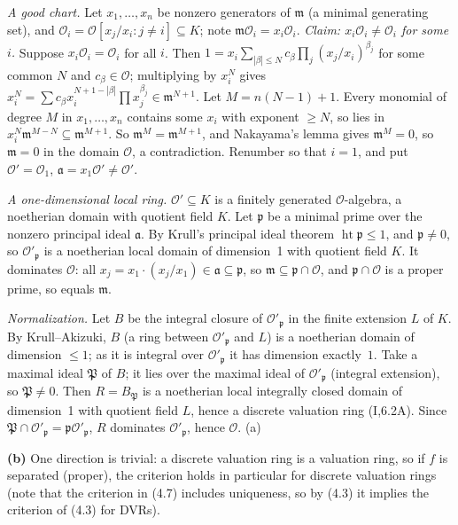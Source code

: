 \documentclass[11pt]{article}
\begin{document}
\emph{A good chart.} Let $x_1,\dots,x_n$ be nonzero generators of $\mathfrak m$ (a minimal generating set), and $\mathcal O_i=\mathcal O[x_j/x_i:j\neq i]\subseteq K$; note $\mathfrak m\mathcal O_i=x_i\mathcal O_i$. \emph{Claim: $x_i\mathcal O_i\neq\mathcal O_i$ for some $i$.} Suppose $x_i\mathcal O_i=\mathcal O_i$ for all $i$. Then $1=x_i\sum_{|\beta|\le N}c_\beta\prod_j(x_j/x_i)^{\beta_j}$ for some common $N$ and $c_\beta\in\mathcal O$; multiplying by $x_i^N$ gives $x_i^N=\sum c_\beta x_i^{N+1-|\beta|}\prod x_j^{\beta_j}\in\mathfrak m^{N+1}$. Let $M=n(N-1)+1$. Every monomial of degree $M$ in $x_1,\dots,x_n$ contains some $x_i$ with exponent $\ge N$, so lies in $x_i^N\mathfrak m^{M-N}\subseteq\mathfrak m^{M+1}$. So $\mathfrak m^M=\mathfrak m^{M+1}$, and Nakayama's lemma gives $\mathfrak m^M=0$, so $\mathfrak m=0$ in the domain $\mathcal O$, a contradiction. Renumber so that $i=1$, and put $\mathcal O'=\mathcal O_1$, $\mathfrak a=x_1\mathcal O'\neq\mathcal O'$.

\emph{A one-dimensional local ring.} $\mathcal O'\subseteq K$ is a finitely generated $\mathcal O$-algebra, a noetherian domain with quotient field $K$. Let $\mathfrak p$ be a minimal prime over the nonzero principal ideal $\mathfrak a$. By Krull's principal ideal theorem $\operatorname{ht}\mathfrak p\le1$, and $\mathfrak p\neq0$, so $\mathcal O'_{\mathfrak p}$ is a noetherian local domain of dimension~1 with quotient field $K$. It dominates $\mathcal O$: all $x_j=x_1\cdot(x_j/x_1)\in\mathfrak a\subseteq\mathfrak p$, so $\mathfrak m\subseteq\mathfrak p\cap\mathcal O$, and $\mathfrak p\cap\mathcal O$ is a proper prime, so equals $\mathfrak m$.

\emph{Normalization.} Let $B$ be the integral closure of $\mathcal O'_{\mathfrak p}$ in the finite extension $L$ of $K$. By Krull--Akizuki, $B$ (a ring between $\mathcal O'_{\mathfrak p}$ and $L$) is a noetherian domain of dimension $\le1$; as it is integral over $\mathcal O'_{\mathfrak p}$ it has dimension exactly~$1$. Take a maximal ideal $\mathfrak P$ of $B$; it lies over the maximal ideal of $\mathcal O'_{\mathfrak p}$ (integral extension), so $\mathfrak P\ne0$. Then $R=B_{\mathfrak P}$ is a noetherian local integrally closed domain of dimension~1 with quotient field $L$, hence a discrete valuation ring (I,6.2A). Since $\mathfrak P\cap\mathcal O'_{\mathfrak p}=\mathfrak p\mathcal O'_{\mathfrak p}$, $R$ dominates $\mathcal O'_{\mathfrak p}$, hence $\mathcal O$. \hfill(a)

\textbf{(b)} One direction is trivial: a discrete valuation ring is a valuation ring, so if $f$ is separated (proper), the criterion holds in particular for discrete valuation rings (note that the criterion in (4.7) includes uniqueness, so by (4.3) it implies the criterion of (4.3) for DVRs).
\end{document}
